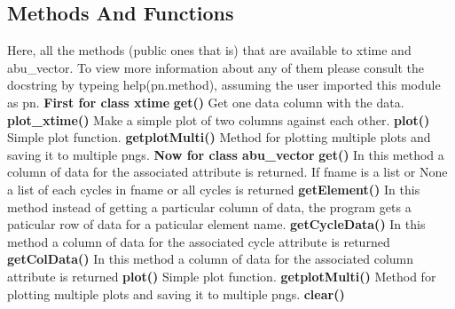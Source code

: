 \subsection{Methods And Functions}
Here, all the methods (public ones that is) that are available to xtime and abu\_vector. To view more information 
about any of them please consult the docstring by typeing help(pn.method), assuming
the user imported this module as pn.\newline
\newline
{\bf First for class xtime}\newline
{\bf get()}\newline 
Get one data column with the data.\newline
{\bf plot\_xtime()}\newline 
Make a simple plot of two columns against each other.\newline
{\bf plot()}\newline 
Simple plot function.\newline
{\bf getplotMulti()}\newline 
Method for plotting multiple plots and saving it to multiple pngs.\newline
\newline
{\bf Now for class abu\_vector}\newline
{\bf get()}\newline 
In this method a column of data for the associated attribute is
returned. If fname is a list or None a list of each cycles in 
fname or all cycles is returned\newline
{\bf getElement()}\newline 
In this method instead of getting a particular column of data,
the program gets a paticular row of data for a paticular 
element name.\newline
{\bf getCycleData()}\newline 
In this method a column of data for the associated cycle attribute is returned\newline
{\bf getColData()}\newline 
In this method a column of data for the associated column attribute is returned\newline
{\bf plot()}\newline 
Simple plot function.\newline
{\bf getplotMulti()}\newline 
Method for plotting multiple plots and saving it to multiple pngs.\newline
{\bf clear()}\newline 
